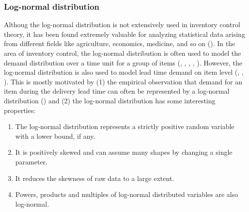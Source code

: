 \documentclass{article}
\begin{document}
\subsubsection{Log-normal distribution}
\begin{flushleft}
    Althoug the log-normal distribution is not extensively used in inventory control theory, it has been found extremely valuable for analyzing statistical data arising from different fields like agriculture, economics, medicine, and so on (\cite{https://doi.org/10.2307/1235218}).
    In the area of inventory control, the log-normal distribution is often used to model the demand distribution over a time unit for a group of items (\cite{brown1959statistical}, \cite{DAS1983267}, \cite{Herron01061976}, \cite{https://doi.org/10.1111/j.1540-5915.1972.tb00547.x}, \cite{Howard1976}).
    However, the log-normal distribution is also used to model lead time demand on item level (\cite{COBB20131842}, \cite{DAS1983267}, \cite{TADIKAMALLA1979553}).
    This is mostly motivated by (1) the empirical observation that demand for an item during the delivery lead time can often be represented by a log-normal distribution (\cite{Trux1971}) and (2) the log-normal distribution has some interesting properties:
    \begin{enumerate}
        \item The log-normal distribution represents a strictly positive random variable with a lower bound, if any.
        \item It is positively skewed and can assume many shapes by changing a single parameter.
        \item It reduces the skewness of raw data to a large extent.
        \item Powers, products and multiples of log-normal distributed variables are also log-normal.
    \end{enumerate}
\end{flushleft}
\end{document}
